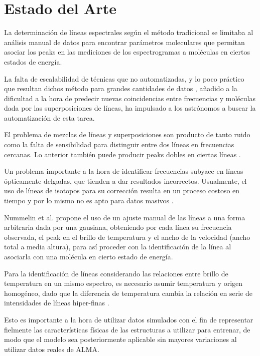 \section{Estado del Arte}
La determinación de líneas espectrales según el método tradicional se limitaba al análisis manual de datos para encontrar parámetros moleculares que permitan asociar los peaks en las mediciones de los espectrogramas a moléculas en ciertos estados de energía.

La falta de escalabilidad de técnicas que no automatizadas, y lo poco práctico que resultan dichos método para grandes cantidades de datos \cite{Schilke2001}, añadido a la dificultad a la hora de predecir nuevas coincidencias entre frecuencias y moléculas dada por las superposiciones de líneas, ha impulsado a los astrónomos a buscar la automatización de esta tarea.

El problema de mezclas de líneas y superposiciones son producto de tanto ruido como la falta de sensibilidad  para distinguir entre dos líneas en frecuencias cercanas. Lo anterior también puede producir peaks dobles en ciertas líneas \cite{Cernicharo2013}.

Un problema importante a la hora de identificar frecuencias subyace en líneas ópticamente delgadas, que tienden a dar resultados incorrectos. Usualmente, el uso de líneas de isotopos para su corrección resulta en un proceso costoso en tiempo y por lo mismo no es apto para datos masivos \cite{Schilke2001}.

Nummelin et al. \cite{Nummelin1998} propone el uso de un ajuste manual de las líneas a una forma arbitraria dada por una gausiana, obteniendo por cada línea su frecuencia observada, el peak en el brillo de temperatura y el ancho de la velocidad (ancho total a media altura), para así proceder con la identificación de la línea al asociarla con una molécula en cierto estado de energía. 

Para la identificación de líneas considerando las relaciones entre brillo de temperatura en un mismo espectro, es necesario asumir temperatura y origen homogéneo, dado que la diferencia de temperatura cambia la relación en serie de intensidades de líneas hiper-finas \cite{Nummelin2000}. 

Esto es importante a la hora de utilizar datos simulados con el fin de representar fielmente las características físicas de las estructuras a utilizar para entrenar, de modo que el modelo sea posteriormente aplicable sin mayores variaciones al utilizar datos reales de ALMA.

